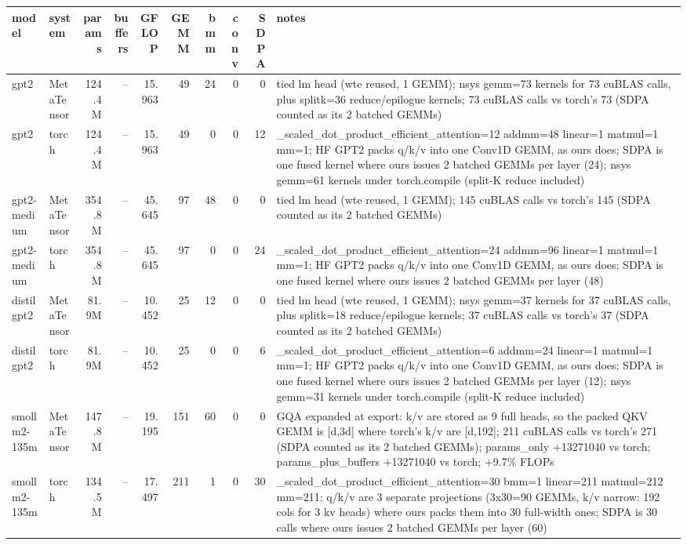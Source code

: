 \begin{tabular}{llrrrrrrrp{}}
\toprule
model & system & params & buffers & GFLOP & GEMM & bmm & conv & SDPA & notes \\
\midrule
gpt2 & MetaTensor & 124.4M & -- & 15.963 & 49 & 24 & 0 & 0 & tied lm head (wte reused, 1 GEMM); nsys gemm=73 kernels for 73 cuBLAS calls, plus splitk=36 reduce/epilogue kernels; 73 cuBLAS calls vs torch's 73 (SDPA counted as its 2 batched GEMMs) \\
gpt2 & torch & 124.4M & -- & 15.963 & 49 & 0 & 0 & 12 & \_scaled\_dot\_product\_efficient\_attention=12 addmm=48 linear=1 matmul=1 mm=1; HF GPT2 packs q/k/v into one Conv1D GEMM, as ours does; SDPA is one fused kernel where ours issues 2 batched GEMMs per layer (24); nsys gemm=61 kernels under torch.compile (split-K reduce included) \\
gpt2-medium & MetaTensor & 354.8M & -- & 45.645 & 97 & 48 & 0 & 0 & tied lm head (wte reused, 1 GEMM); 145 cuBLAS calls vs torch's 145 (SDPA counted as its 2 batched GEMMs) \\
gpt2-medium & torch & 354.8M & -- & 45.645 & 97 & 0 & 0 & 24 & \_scaled\_dot\_product\_efficient\_attention=24 addmm=96 linear=1 matmul=1 mm=1; HF GPT2 packs q/k/v into one Conv1D GEMM, as ours does; SDPA is one fused kernel where ours issues 2 batched GEMMs per layer (48) \\
distilgpt2 & MetaTensor & 81.9M & -- & 10.452 & 25 & 12 & 0 & 0 & tied lm head (wte reused, 1 GEMM); nsys gemm=37 kernels for 37 cuBLAS calls, plus splitk=18 reduce/epilogue kernels; 37 cuBLAS calls vs torch's 37 (SDPA counted as its 2 batched GEMMs) \\
distilgpt2 & torch & 81.9M & -- & 10.452 & 25 & 0 & 0 & 6 & \_scaled\_dot\_product\_efficient\_attention=6 addmm=24 linear=1 matmul=1 mm=1; HF GPT2 packs q/k/v into one Conv1D GEMM, as ours does; SDPA is one fused kernel where ours issues 2 batched GEMMs per layer (12); nsys gemm=31 kernels under torch.compile (split-K reduce included) \\
smollm2-135m & MetaTensor & 147.8M & -- & 19.195 & 151 & 60 & 0 & 0 & GQA expanded at export: k/v are stored as 9 full heads, so the packed QKV GEMM is [d,3d] where torch's k/v are [d,192]; 211 cuBLAS calls vs torch's 271 (SDPA counted as its 2 batched GEMMs); params\_only +13271040 vs torch; params\_plus\_buffers +13271040 vs torch; +9.7\% FLOPs \\
smollm2-135m & torch & 134.5M & -- & 17.497 & 211 & 1 & 0 & 30 & \_scaled\_dot\_product\_efficient\_attention=30 bmm=1 linear=211 matmul=212 mm=211; q/k/v are 3 separate projections (3x30=90 GEMMs, k/v narrow: 192 cols for 3 kv heads) where ours packs them into 30 full-width ones; SDPA is 30 calls where ours issues 2 batched GEMMs per layer (60) \\

\end{tabular}

